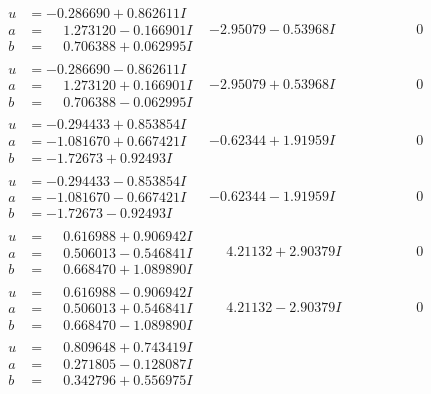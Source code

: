 \documentclass[1p]{elsarticle_modified}
\theoremstyle{definition}
\begin{document}
$$\begin{array}{c|c|c}
\begin{aligned}
u &= -0.286690 + 0.862611 I \\
a &= \phantom{-}1.273120 - 0.166901 I \\
b &= \phantom{-}0.706388 + 0.062995 I\end{aligned}
 & -2.95079 - 0.53968 I & \phantom{-0.000000 } 0 \\ \hline\begin{aligned}
u &= -0.286690 - 0.862611 I \\
a &= \phantom{-}1.273120 + 0.166901 I \\
b &= \phantom{-}0.706388 - 0.062995 I\end{aligned}
 & -2.95079 + 0.53968 I & \phantom{-0.000000 } 0 \\ \hline\begin{aligned}
u &= -0.294433 + 0.853854 I \\
a &= -1.081670 + 0.667421 I \\
b &= -1.72673 + 0.92493 I\end{aligned}
 & -0.62344 + 1.91959 I & \phantom{-0.000000 } 0 \\ \hline\begin{aligned}
u &= -0.294433 - 0.853854 I \\
a &= -1.081670 - 0.667421 I \\
b &= -1.72673 - 0.92493 I\end{aligned}
 & -0.62344 - 1.91959 I & \phantom{-0.000000 } 0 \\ \hline\begin{aligned}
u &= \phantom{-}0.616988 + 0.906942 I \\
a &= \phantom{-}0.506013 - 0.546841 I \\
b &= \phantom{-}0.668470 + 1.089890 I\end{aligned}
 & \phantom{-}4.21132 + 2.90379 I & \phantom{-0.000000 } 0 \\ \hline\begin{aligned}
u &= \phantom{-}0.616988 - 0.906942 I \\
a &= \phantom{-}0.506013 + 0.546841 I \\
b &= \phantom{-}0.668470 - 1.089890 I\end{aligned}
 & \phantom{-}4.21132 - 2.90379 I & \phantom{-0.000000 } 0 \\ \hline\begin{aligned}
u &= \phantom{-}0.809648 + 0.743419 I \\
a &= \phantom{-}0.271805 - 0.128087 I \\
b &= \phantom{-}0.342796 + 0.556975 I\end{aligned}

\end{array}$$
\end{document}
